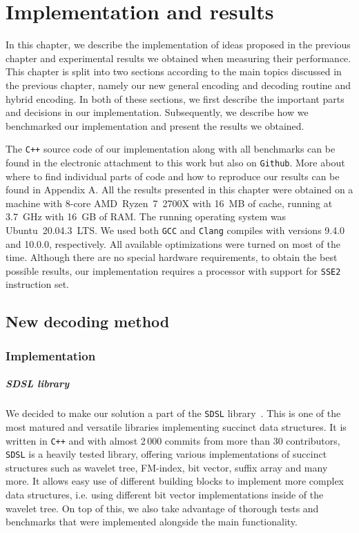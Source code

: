 \chapter{Implementation and results}
\label{kap:kap4}

In this chapter, we describe the implementation of ideas proposed in the previous
chapter and experimental results we obtained when measuring their performance.
This chapter is split into two sections according to the main topics discussed
in the previous chapter, namely our new general encoding and decoding routine and hybrid
encoding. In both of these sections, we first describe the important parts and decisions
in our implementation. Subsequently, we describe how we benchmarked our implementation and
present the results we obtained.

The \texttt{C++} source code of our implementation along with all benchmarks can be found
in the electronic attachment to this work but also on \texttt{Github}. More about where to
find individual parts of code and how to reproduce our results can be found in Appendix A.
All the results presented in this chapter were obtained on a machine with 8-core AMD~Ryzen~7~2700X
with 16~MB of cache, running at 3.7~GHz with 16~GB of RAM. The running operating system
was Ubuntu~20.04.3~LTS. We used both \texttt{GCC} and \texttt{Clang} compiles with versions
9.4.0 and 10.0.0, respectively. All available optimizations were turned on most of the time.
Although there are no special hardware requirements, to obtain the best possible results, our
implementation requires a processor with support for \texttt{SSE2} instruction set.

\section{New decoding method}

\subsection{Implementation}

\paragraph{SDSL library}

We decided to make our solution a part of the \texttt{SDSL} library~\citep{gog2014theory}. This
is one of the most matured and versatile libraries implementing succinct data structures. It is
written in \texttt{C++} and with almost 2\,000 commits from more than 30 contributors, \texttt{SDSL}
is a heavily tested library, offering various implementations of succinct structures such as
wavelet tree, FM-index, bit vector, suffix array and many more. It allows easy use of different
building blocks to implement more complex data structures, i.e. using different bit vector
implementations inside of the wavelet tree. On top of this, we also take advantage of thorough tests
and benchmarks that were implemented alongside the main functionality.

